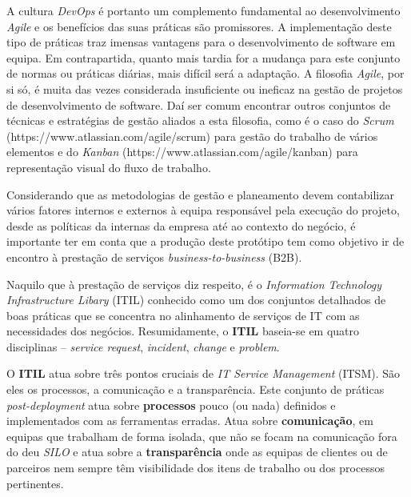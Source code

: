 \hspace{1cm}A cultura \textit{DevOps} é portanto um complemento fundamental ao desenvolvimento \textit{Agile} e os benefícios das suas práticas são promissores. A implementação deste tipo de práticas traz imensas vantagens para o desenvolvimento de software em equipa. Em contrapartida, quanto mais tardia for a mudança para este conjunto de normas ou práticas diárias, mais difícil será a adaptação. A filosofia \textit{Agile}, por si só, é muita das vezes considerada insuficiente ou ineficaz na gestão de projetos de desenvolvimento de software. Daí ser comum encontrar outros conjuntos de técnicas e estratégias de gestão aliados a esta filosofia, como é o caso do \textit{Scrum} (https://www.atlassian.com/agile/scrum) para gestão do trabalho de vários elementos e do \textit{Kanban} (https://www.atlassian.com/agile/kanban) para representação visual do fluxo de trabalho.

\hspace{1cm}Considerando que as metodologias de gestão e planeamento devem contabilizar vários fatores internos e externos à equipa responsável pela execução do projeto, desde as políticas da internas da empresa até ao contexto do negócio, é importante ter em conta que a produção deste protótipo tem como objetivo ir de encontro à prestação de serviços \textit{business-to-business} (B2B).

\hspace{1cm}Naquilo que à prestação de serviços diz respeito, é o \textit{Information Technology Infrastructure Libary} (ITIL) conhecido como um dos conjuntos detalhados de boas práticas que se concentra no alinhamento de serviços de IT com as necessidades dos negócios. Resumidamente, o \textbf{ITIL} baseia-se em quatro disciplinas -- \textit{service request}, \textit{incident}, \textit{change} e \textit{problem}.

\hspace{1cm}O \textbf{ITIL} atua sobre três pontos cruciais de \textit{IT Service Management} (ITSM). São eles os processos, a comunicação e a transparência. Este conjunto de práticas \textit{post-deployment} atua sobre \textbf{processos} pouco (ou nada) definidos e implementados com as ferramentas erradas. Atua sobre \textbf{comunicação}, em equipas que trabalham de forma isolada, que não se focam na comunicação fora do deu \textit{SILO} e atua sobre a \textbf{transparência} onde as equipas de clientes ou de parceiros nem sempre têm visibilidade dos itens de trabalho ou dos processos pertinentes.

